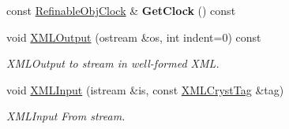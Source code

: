 \begin{DoxyCompactItemize}
const \mbox{\hyperlink{class_obj_cryst_1_1_refinable_obj_clock}{Refinable\+Obj\+Clock}} \& {\bfseries Get\+Clock} () const
\item 
void \mbox{\hyperlink{class_obj_cryst_1_1_ref_obj_opt_aebeb771ffe0744aac86352f38ea67f42}{X\+M\+L\+Output}} (ostream \&os, int indent=0) const
\begin{DoxyCompactList}\small\item\em X\+M\+L\+Output to stream in well-\/formed X\+ML. \end{DoxyCompactList}\item 
void \mbox{\hyperlink{class_obj_cryst_1_1_ref_obj_opt_a9562e469ee61a710e535594fe58f0744}{X\+M\+L\+Input}} (istream \&is, const \mbox{\hyperlink{class_obj_cryst_1_1_x_m_l_cryst_tag}{X\+M\+L\+Cryst\+Tag}} \&tag)
\begin{DoxyCompactList}\small\item\em X\+M\+L\+Input From stream. \end{DoxyCompactList}\end{DoxyCompactItemize}
